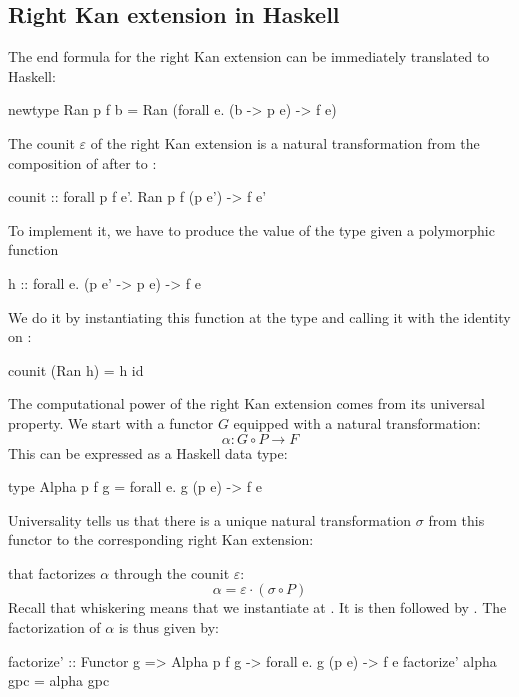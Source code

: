 \documentclass[DaoFP]{subfiles}
\begin{document}
\subsection{Right Kan extension in Haskell}
The end formula for the right Kan extension can be immediately translated to Haskell:
 \begin{haskell}
newtype Ran p f b = Ran (forall e. (b -> p e) -> f e)
 \end{haskell}
 
 The counit $\varepsilon$ of the right Kan extension is a natural transformation from the composition of  after  to :
 \begin{haskell}
counit :: forall p f e'. Ran p f (p e') -> f e'
\end{haskell}
To implement it, we have to produce the value of the type  given a polymorphic function 
 \begin{haskell}
h :: forall e. (p e' -> p e) -> f e
\end{haskell}
We do it by instantiating this function at the type  and calling it with the identity on :
 \begin{haskell}
counit (Ran h) = h id
\end{haskell}

The computational power of the right Kan extension comes from its universal property. We start with a functor $G$ equipped with a natural transformation: 
\[ \alpha \colon G \circ P \to F \]
This can be expressed as a Haskell data type:
\begin{haskell}
type Alpha p f g = forall e. g (p e) -> f e
\end{haskell}
Universality tells us that there is a unique natural transformation $\sigma$ from this functor to the corresponding right Kan extension:
that factorizes $\alpha$ through the counit $\varepsilon$:
\[ \alpha = \varepsilon \cdot (\sigma \circ P) \]
Recall that whiskering means that we instantiate  at . It is then followed by . The factorization of $\alpha$ is thus given by:
\begin{haskell}
factorize' :: Functor g => Alpha p f g -> forall e. g (p e) -> f e
factorize' alpha gpc = alpha gpc
\end{haskell}
\end{document}
